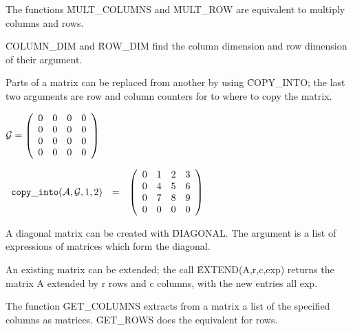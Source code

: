 The functions \f{MULT\_COLUMNS} and
\f{MULT\_ROW} are equivalent to multiply columns
and rows.


\f{COLUMN\_DIM} and
\f{ROW\_DIM} find the column dimension and row
dimension of their argument.

Parts of a matrix can be replaced from another by using
\f{COPY\_INTO}; the last two arguments are row and
column counters for to where to copy the matrix.

\begin{flushleft}
\hspace*{0.175in}
\begin{math}  
{\cal G} = \left( \begin{array}{cccc} 0 & 0 & 0 & 0 \\ 0 & 0 & 0 & 0 \\
0 & 0 & 0 & 0 \\ 0 & 0 & 0 & 0
\end{array} \right)
\end{math}  
\end{flushleft}

\begin{flushleft}
\hspace*{0.1in}
\begin{math}  
\begin{array}{ccc}
{\tt copy\_into}({\cal A,G},1,2) & = & 
\left( \begin{array}{cccc} 0 & 1 & 2 & 3 \\ 0 & 4 & 5 & 6 \\ 0 & 7 & 8 
& 9 \\ 0 & 0 & 0 & 0  
\end{array} \right)
\end{array}
\end{math}  
\end{flushleft}

A diagonal matrix can be created with \f{DIAGONAL}.
The argument is a list of expressions of matrices which form the
diagonal.

An existing matrix can be extended; the call \f{EXTEND}(A,r,c,exp)
returns the matrix A extended by r rows and c columns, with the new
entries all exp.

The function \f{GET\_COLUMNS} extracts from a
matrix a list of the specified columns as matrices. 
\f{GET\_ROWS} does the equivalent for rows.

